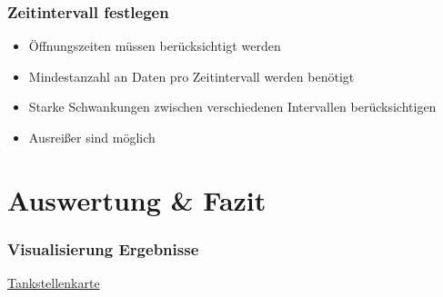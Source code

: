 \documentclass[hyperref={pdfpagelabels=false}]{beamer}
\begin{document}
\begin{frame}
\frametitle{Zeitintervall festlegen}
\begin{itemize}
\item Öffnungszeiten müssen berücksichtigt werden
\item Mindestanzahl an Daten pro Zeitintervall werden benötigt
\item Starke Schwankungen zwischen verschiedenen Intervallen berücksichtigen
\item Ausreißer sind möglich
\end{itemize}
\end{frame}

\section{Auswertung \& Fazit}
\begin{frame}
\frametitle{Visualisierung Ergebnisse} 
\href{http://10.1.0.1:8091/client/}{Tankstellenkarte}
\end{frame}
\end{document}

